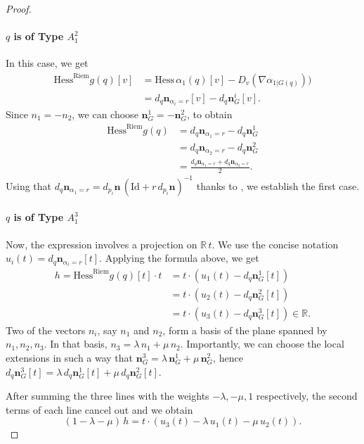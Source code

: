 \documentclass[11pt]{article}
\newcommand{\R}{\mathbb{R}}
\newcommand{\nbf}{\mathbf{n}}
\newcommand{\grad}{\nabla}
\newcommand{\Hess}{\mathrm{Hess}}
\newcommand{\Id}{\mathrm{Id}}
\theoremstyle{plain}
\theoremstyle{definition}
\theoremstyle{remark}
\begin{document}
\begin{proof}
	\paragraph{$q$ is of Type $A_1^2$}
	In this case, we get
	\begin{align*}
		\Hess^{\mathrm{Riem}} g(q)[v] &= \Hess \, \alpha_1(q)[v] - D_v(\grad \alpha_{1|G(q)})) \\
		&= d_q \nbf_{\alpha_i = r}[v] - d_q \nbf^i_G[v].
	\end{align*}
	Since $n_1 = -n_2$, we can choose $\nbf^1_G = -\nbf^2_G$, to obtain
	\begin{align*}
		\Hess^{\mathrm{Riem}} g(q) &= d_q \nbf_{\alpha_1 = r} - d_q \nbf^1_G \\
		&= d_q \nbf_{\alpha_2 = r} - d_q \nbf^2_G \\
		&= \frac{d_q \nbf_{\alpha_1 = r} + d_q \nbf_{\alpha_2 = r}}{2}.
	\end{align*}
	Using that $d_q \nbf_{\alpha_1 = r} = d_{p_i} \nbf \, (\Id + r \, d_{p_i} \nbf )^{-1}$ thanks to , we establish the first case.
	
	\paragraph{$q$ is of Type $A_1^3$}
	Now, the expression involves a projection on $\R \, t$. We use the concise notation $u_i(t) = d_q \nbf_{\alpha_i = r}[t]$. Applying the formula above, we get
	\begin{align*}
		h = \Hess^{\mathrm{Riem}} g(q)[t] \cdot t &= t \cdot (u_1(t) - d_q \nbf^1_G[t]) \\
		&= t \cdot(u_2(t) - d_q \nbf^2_G[t]) \\
		&= t \cdot(u_3(t) - d_q \nbf^3_G[t]) \in \R.
	\end{align*} 
	Two of the vectors $n_i$, say $n_1$ and $n_2$, form a basis of the plane spanned by $n_1,n_2,n_3$. In that basis, $n_3 = \lambda \, n_1 + \mu \, n_2$. Importantly, we can choose the local extensions in such a way that $\nbf^3_G = \lambda \, \nbf^1_G + \mu \, \nbf^2_G$, hence $d_q \nbf^3_G[t] = \lambda \, d_q \nbf^1_G[t] + \mu \, d_q \nbf^2_G[t]$.
	
	After summing the three lines with the weights $-\lambda, -\mu, 1$ respectively, the second terms of each line cancel out and we obtain
	\[(1 - \lambda - \mu) \, h = t \cdot \left(u_3(t) - \lambda \, u_1(t) - \mu \, u_2(t) \right).\]
	

\end{proof}
\end{document}
